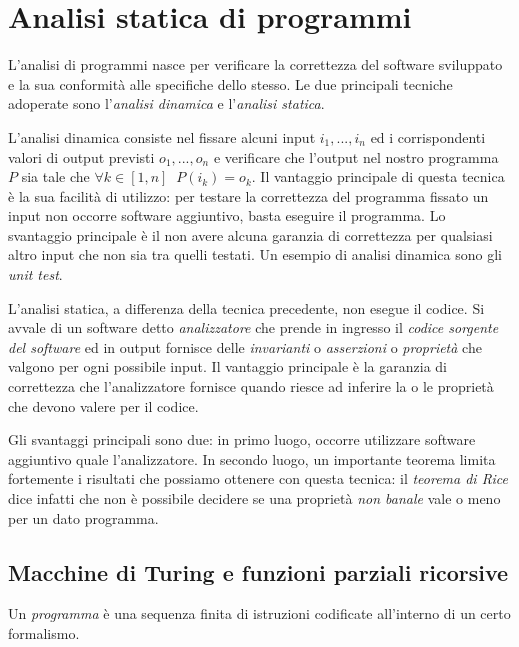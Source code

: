 \newcommand{\primrec}{\mathcal{P\!\!R}}

\chapter{Analisi statica di programmi}

L'analisi di programmi nasce per verificare la correttezza del software sviluppato e la sua conformità alle specifiche dello stesso. Le due principali tecniche adoperate sono l'\emph{analisi dinamica} e l'\emph{analisi statica}.

L'analisi dinamica consiste nel fissare alcuni input $i_1, ..., i_n$ ed i corrispondenti valori di output previsti $o_1, ..., o_n$ e verificare che l'output nel nostro programma $P$ sia tale che $\forall k \in [1,n] \;\; P(i_k) = o_k$. Il vantaggio principale di questa tecnica è la sua facilità di utilizzo: per testare la correttezza del programma fissato un input non occorre software aggiuntivo, basta eseguire il programma. Lo svantaggio principale è il non avere alcuna garanzia di correttezza per qualsiasi altro input che non sia tra quelli testati. Un esempio di analisi dinamica sono gli \emph{unit test}. 

L'analisi statica, a differenza della tecnica precedente, non esegue il codice. Si avvale di un software detto \emph{analizzatore} che prende in ingresso il \emph{codice sorgente del software} ed in output fornisce delle \emph{invarianti} o \emph{asserzioni} o \emph{proprietà} che valgono per ogni possibile input. Il vantaggio principale è la garanzia di correttezza che l'analizzatore fornisce quando riesce ad inferire la o le proprietà che devono valere per il codice. 

Gli svantaggi principali sono due: in primo luogo, occorre utilizzare software aggiuntivo quale l'analizzatore. In secondo luogo, un importante teorema limita fortemente i risultati che possiamo ottenere con questa tecnica: il \emph{teorema di Rice} dice infatti che non è possibile decidere se una proprietà \emph{non banale} vale o meno per un dato programma. 

\section{Macchine di Turing e funzioni parziali ricorsive}

\begin{definition}[Programma]
Un \emph{programma} è una sequenza finita di istruzioni codificate all'interno di un certo formalismo.
\end{definition}

